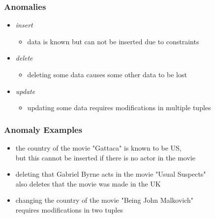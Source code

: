 \documentclass[dvipsnames]{beamer}
\begin{document}
\begin{frame}
  \frametitle{Anomalies}

  \begin{itemize}
    \item \emph{insert}
    \begin{itemize}
      \item data is known but can not be inserted due to constraints
    \end{itemize}

    \pause
    \item \emph{delete}
    \begin{itemize}
        \item deleting some data causes some other data to be lost
    \end{itemize}

    \pause
    \item \emph{update}
    \begin{itemize}
      \item updating some data requires modifications in multiple tuples
    \end{itemize}
  \end{itemize}
\end{frame}

\begin{frame}
  \frametitle{Anomaly Examples}

  \begin{example}
    \begin{itemize}
      \item the country of the movie "Gattaca" is known to be US,\\
	but this cannot be inserted if there is no actor in the movie

      \pause
      \item deleting that Gabriel Byrne acts in the movie "Usual Suspects"\\
        also deletes that the movie was made in the UK

      \pause
      \item changing the country of the movie "Being John Malkovich"\\
        requires modifications in two tuples
    \end{itemize}
  \end{example}
\end{frame}
\end{document}

